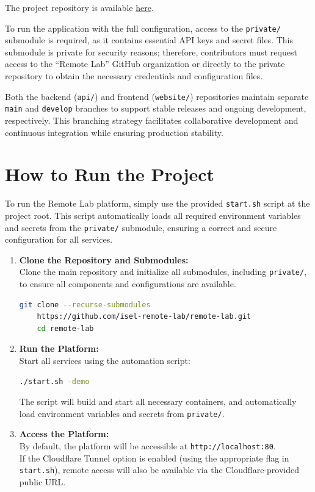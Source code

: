 \documentclass[a4paper,11pt]{report}
\begin{document}
The project repository is available \href{https://github.com/isel-remote-lab/remote-lab}{here}.

To run the application with the full configuration, access to the \texttt{private/} submodule is required, as it contains essential API keys and secret files. This submodule is private for security reasons; therefore, contributors must request access to the ``Remote Lab'' GitHub organization or directly to the private repository to obtain the necessary credentials and configuration files.

Both the backend (\texttt{api/}) and frontend (\texttt{website/}) repositories maintain separate \texttt{main} and \texttt{develop} branches to support stable releases and ongoing development, respectively. This branching strategy facilitates collaborative development and continuous integration while ensuring production stability.

\section*{How to Run the Project}

To run the Remote Lab platform, simply use the provided \texttt{start.sh} script at the project root. This script automatically loads all required environment variables and secrets from the \texttt{private/} submodule, ensuring a correct and secure configuration for all services.

\begin{enumerate}
    \item \textbf{Clone the Repository and Submodules:}  \\
    Clone the main repository and initialize all submodules, including \texttt{private/}, to ensure all components and configurations are available.
    \begin{lstlisting}[language=bash]
    git clone --recurse-submodules 
    https://github.com/isel-remote-lab/remote-lab.git
    cd remote-lab
    \end{lstlisting}

    \item \textbf{Run the Platform:}  \\
    Start all services using the automation script:
    \begin{lstlisting}[language=bash]
    ./start.sh -demo
    \end{lstlisting}
    The script will build and start all necessary containers, and automatically load environment variables and secrets from \texttt{private/}.

    \item \textbf{Access the Platform:}  \\
    By default, the platform will be accessible at \texttt{http://localhost:80}.
    \\If the Cloudflare Tunnel option is enabled (using the appropriate flag in \texttt{start.sh}), remote access will also be available via the Cloudflare-provided public URL.
\end{enumerate}
\end{document}
